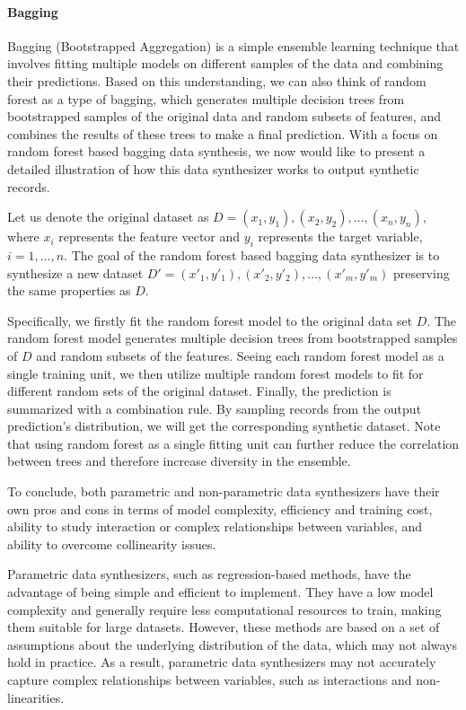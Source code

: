\paragraph{Bagging}
Bagging (Bootstrapped Aggregation) is a simple ensemble learning technique that involves fitting multiple models on different samples of the data and combining their predictions. Based on this understanding, we can also think of random forest as a type of bagging, which generates multiple decision trees from bootstrapped samples of the original data and random subsets of features, and combines the results of these trees to make a final prediction. With a focus on random forest based bagging data synthesis, we now would like to present a detailed illustration of how this data synthesizer works to output synthetic records.

Let us denote the original dataset as $D = { (x_1,y_1),(x_2,y_2),\dots,(x_n,y_n)}$, where $x_i$ represents the feature vector and $y_i$ represents the target variable, $i=1,...,n$. The goal of the random forest based bagging data synthesizer is to synthesize a new dataset $D' = { (x'_1,y'_1),(x'_2,y'_2),\dots,(x'_m,y'_m)}$ preserving the same properties as $D$.

Specifically, we firstly fit the random forest model to the original data set $D$. The random forest model generates multiple decision trees from bootstrapped samples of $D$ and random subsets of the features. Seeing each random forest model as a single training unit, we then utilize multiple random forest models to fit for different random sets of the original dataset. Finally, the prediction is summarized with a combination rule. By sampling records from the output prediction's distribution, we will get the corresponding synthetic dataset. Note that using random forest as a single fitting unit can further reduce the correlation between trees and therefore increase diversity in the ensemble.

To conclude, both parametric and non-parametric data synthesizers have their own pros and cons in terms of model complexity, efficiency and training cost, ability to study interaction or complex relationships between variables, and ability to overcome collinearity issues.

Parametric data synthesizers, such as regression-based methods, have the advantage of being simple and efficient to implement. They have a low model complexity and generally require less computational resources to train, making them suitable for large datasets. However, these methods are based on a set of assumptions about the underlying distribution of the data, which may not always hold in practice. As a result, parametric data synthesizers may not accurately capture complex relationships between variables, such as interactions and non-linearities.

